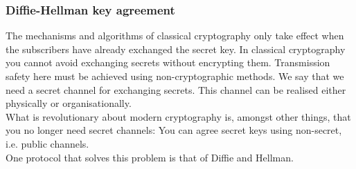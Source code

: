 \subsubsection[Diffie-Hellman key agreement]
{Diffie-Hellman key agreement\footnotemark}

\hypertarget{DH-KeyExch}{} \label{DH-KeyExch}

The mechanisms and 
algorithms of classical cryptography only take effect when the subscribers have 
already exchanged the secret key. In classical cryptography you cannot avoid 
exchanging secrets without encrypting them. Transmission safety here must be 
achieved using non-cryptographic methods. We say that we need a secret channel 
for exchanging secrets. This channel can be realised either physically or 
organisationally. \\
What is revolutionary about modern cryptography is, amongst other things, that 
you no longer need secret channels: You can agree secret keys using non-secret, 
i.e. public channels. \\
One protocol that solves this problem is that of Diffie and Hellman. \\

\begin{center}
\end{center}

